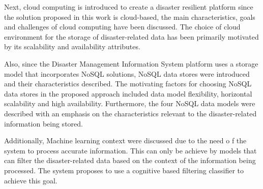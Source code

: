 Next, cloud computing is introduced to create a disaster resilient platform since the solution proposed in this work is cloud-based, the main characteristics, goals and challenges of cloud computing have been discussed. The choice of cloud environment for the storage of disaster-related data has been primarily motivated by its scalability and availability attributes. 

Also, since the Disaster Management Information System platform uses a storage model that incorporates NoSQL solutions, NoSQL data stores were introduced and their characteristics described. The motivating factors for choosing NoSQL data stores in the proposed approach included data model flexibility, horizontal scalability and high availability. Furthermore, the four NoSQL data models were described with an emphasis on the characteristics relevant to the disaster-related information being stored.

Additionally, Machine learning context were discussed due to the need o f the system to process accurate information. This can only be achieve by models that can filter the disaster-related data based on the context of the information being processed. The system proposes to use a cognitive based filtering classifier to achieve this goal.



